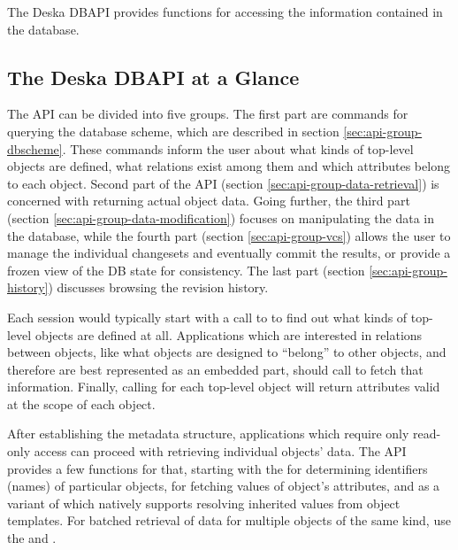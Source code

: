 \documentclass{article}
\begin{document}
The Deska DBAPI provides functions for accessing the information contained in the database.

\subsection{The Deska DBAPI at a Glance}

The API can be divided into five groups.  The first part are commands for querying the database scheme, which are
described in section \ref{sec:api-group-dbscheme}.  These commands inform the user about what kinds of top-level objects are
defined, what relations exist among them and which attributes belong to each object.  Second part of the API
(section \ref{sec:api-group-data-retrieval}) is concerned with returning actual object data.  Going further, the third
part (section \ref{sec:api-group-data-modification}) focuses on manipulating the data in the database, while the fourth
part (section \ref{sec:api-group-vcs}) allows the user to manage the individual changesets and eventually commit the
results, or provide a frozen view of the DB state for consistency.  The last part (section \ref{sec:api-group-history})
discusses browsing the revision history.

Each session would typically start with a call to  to find out what kinds of top-level objects
are defined at all.  Applications which are interested in relations between objects, like what objects are designed to
``belong'' to other objects, and therefore are best represented as an embedded part, should call
 to fetch that information.  Finally, calling  for each
top-level object will return attributes valid at the scope of each object.

After establishing the metadata structure, applications which require only read-only access can proceed with retrieving
individual objects' data.  The API provides a few functions for that, starting with the  for
determining identifiers (names) of particular objects,  for fetching values of object's
attributes, and  as a variant of  which natively supports
resolving inherited values from object templates.  For batched retrieval of data for multiple objects of the same kind,
use the  and .
\end{document}
